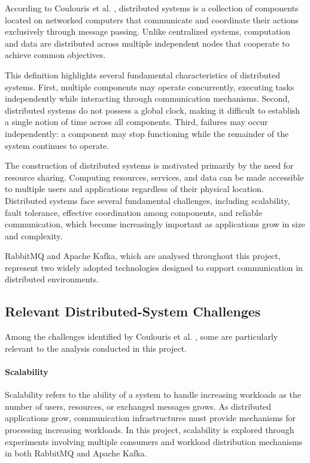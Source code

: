 \documentclass{scrartcl}
\begin{document}
According to Coulouris et al. \textbf{\cite{coulouris2011}}, distributed systems is a collection of components located on networked computers that communicate and coordinate their actions exclusively through message passing. Unlike centralized systems, computation and data are distributed across multiple independent nodes that cooperate to achieve common objectives.

This definition highlights several fundamental characteristics of distributed systems. First, multiple components may operate concurrently, executing tasks independently while interacting through communication mechanisms. Second, distributed systems do not possess a global clock, making it difficult to establish a single notion of time across all components. Third, failures may occur independently: a component may stop functioning while the remainder of the system continues to operate.

The construction of distributed systems is motivated primarily by the need for resource sharing. Computing resources, services, and data can be made accessible to multiple users and applications regardless of their physical location. Distributed systems face several fundamental challenges, including scalability, fault tolerance, effective coordination among components, and reliable communication, which become increasingly important as applications grow in size and complexity.

RabbitMQ and Apache Kafka, which are analysed throughout this project, represent two widely adopted technologies designed to support communication in distributed environments.

\subsection{Relevant Distributed-System Challenges}

Among the challenges identified by Coulouris et al. \cite{coulouris2011}, some are particularly relevant to the analysis conducted in this project.

\paragraph{Scalability}

Scalability refers to the ability of a system to handle increasing workloads as the number of users, resources, or exchanged messages grows. As distributed applications grow, communication infrastructures must provide mechanisms for processing increasing workloads. In this project, scalability is explored through experiments involving multiple consumers and workload distribution mechanisms in both RabbitMQ and Apache Kafka.
\end{document}
